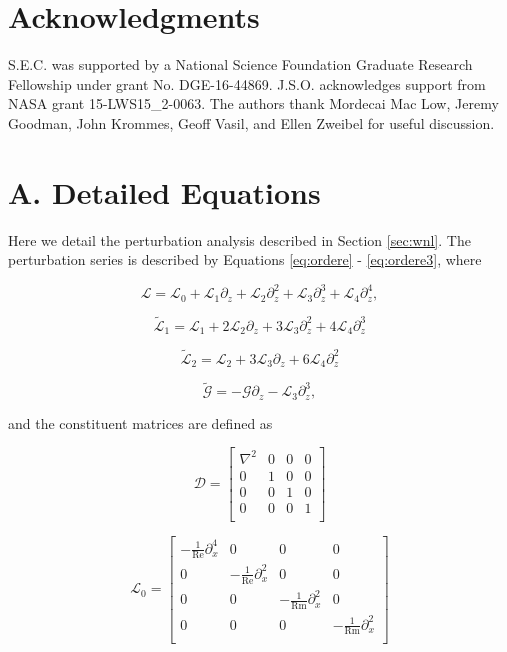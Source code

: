 \documentclass{emulateapj}
\newcommand{\beq}{\begin{equation}}
\newcommand{\eeq}{\end{equation}}
\newcommand\reye{\mathrm{Re}}
\newcommand\reym{\mathrm{Rm}}
\begin{document}
\section{Acknowledgments}
S.E.C. was supported by a National Science Foundation Graduate Research Fellowship under grant No. DGE-16-44869. J.S.O. acknowledges support from NASA grant 15-LWS15\_2-0063. The authors thank Mordecai Mac Low, Jeremy Goodman, John Krommes, Geoff Vasil, and Ellen Zweibel for useful discussion.

\clearpage
\appendix

\section{A. Detailed Equations}\label{app:matrices}

Here we detail the perturbation analysis described in Section \ref{sec:wnl}. The perturbation series is described by Equations \ref{eq:ordere} - \ref{eq:ordere3}, where 

\beq
\mathcal{L} = \mathcal{L}_0 + \mathcal{L}_1 \partial_z + \mathcal{L}_2 \partial_z^2 + \mathcal{L}_3 \partial_z^3 + \mathcal{L}_4 \partial_z^4,
\eeq

\beq
\widetilde{\mathcal{L}}_1 =  \mathcal{L}_1 + 2\mathcal{L}_2\partial_z + 3\mathcal{L}_3\partial_z^2 + 4\mathcal{L}_4\partial_z^3
\eeq

\beq
\widetilde{\mathcal{L}}_2 = \mathcal{L}_2 + 3\mathcal{L}_3\partial_z + 6\mathcal{L}_4\partial_z^2
\eeq

\beq
\widetilde{\mathcal{G}} = - \mathcal{G} \partial_z - \mathcal{L}_3 \partial_z^3,
\eeq

and the constituent matrices are defined as 

\beq
\mathcal{D} = \left[\begin{matrix}
\nabla^2 & 0 & 0 & 0 \\
0 & 1& 0 & 0 \\
0 & 0 & 1 & 0\\
0 & 0 & 0 & 1 \\
\end{matrix}\right]
\eeq

\beq
\mathcal{L}_0 = \left[\begin{matrix}
-\frac{1}{\reye}\partial_x^4 & 0 & 0 & 0 \\
0 & -\frac{1}{\reye}\partial_x^2 & 0 &0 \\
0 & 0 & -\frac{1}{\reym}\partial_x^2 & 0 \\
0 & 0 & 0 & -\frac{1}{\reym}\partial_x^2 \\ \end{matrix}\right]
\eeq
\end{document}
